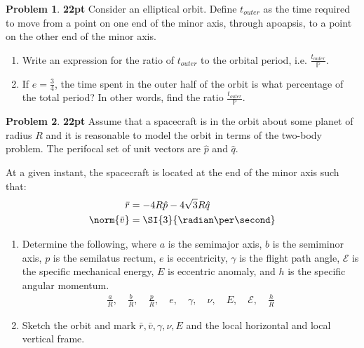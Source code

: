 \documentclass[10pt]{article}
\theoremstyle{definition}
\newtheorem{prob}{Problem}[section]
\newenvironment{subprob}%
{\renewcommand{\theenumi}{\alph{enumi}}\renewcommand{\labelenumi}{(\theenumi)}\begin{enumerate}}%
{\end{enumerate}}%
\begin{document}
\clearpage\newpage
\begin{prob}
    \textbf{22pt}
Consider an elliptical  orbit.
Define \( t_{outer} \) as the time required to move from a point on one end of the minor axis, through apoapsis, to a point on the other end of the minor axis.

\begin{subprob}
    \item Write an expression for the ratio of \( t_{outer} \) to the orbital period, i.e. \(\frac{t_{outer}}{\mathbb{P}}\).
    \item If \( e = \frac{3}{4} \), the time spent in the outer half of the orbit is what percentage of the total period? In other words, find the ratio \( \frac{t_{outer}}{\mathbb{P}} \).
\end{subprob}
\end{prob}

\clearpage\newpage
\begin{prob}
    \textbf{22pt}
    Assume that a spacecraft is in the orbit about some planet of radius \( R\) and it is reasonable to model the orbit in terms of the two-body problem.
    The perifocal set of unit vectors are \( \hat p \) and \( \hat q \).

    At a given instant, the spacecraft is located at the end of the minor axis such that:
    \begin{align*}
        \bar r &= -4 R \hat p - 4 \sqrt{3} R \hat q \\
        \norm{\bar v} &= \SI{3}{\radian\per\second}
    \end{align*}

\begin{subprob}
\item Determine the following, where \( a \) is the semimajor axis, \( b \) is the semiminor axis, \( p \) is the semilatus rectum, \( e \) is eccentricity, \( \gamma \) is the flight path angle, \( \mathcal{E} \) is the specific mechanical energy, \( E \) is eccentric anomaly, and \( h \) is the specific angular momentum.
        \begin{align*}
            \frac{a}{R}, \quad \frac{b}{R}, \quad \frac{p}{R}, \quad e, \quad \gamma, \quad \nu, \quad E, \quad \mathcal{E}, \quad \frac{h}{R}
        \end{align*}
    \item Sketch the orbit and mark \( \bar r, \bar v , \gamma, \nu, E\) and the local horizontal and local vertical frame.
\end{subprob}
\end{prob}
\end{document}
